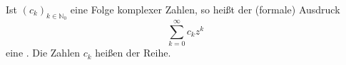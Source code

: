 Ist $(c_k)_{k \in \mathbb{N}_0}$ eine  Folge komplexer Zahlen, so heißt der (formale) Ausdruck
$$\sum_{k=0}^\infty c_k z^k$$
eine . Die Zahlen $c_k$ heißen  der Reihe.